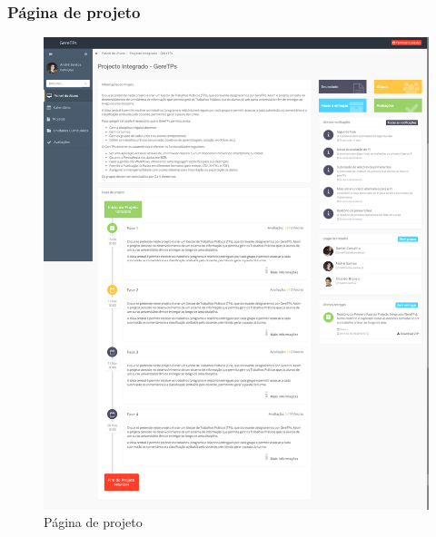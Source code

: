 \subsubsection{Página de projeto}

\begin{figure}[H]
  \centering
  \includegraphics[width=1\textwidth,center]{images/implementacao/alunos/project}
  \caption{Página de projeto}
  \label{fig:student_project}
\end{figure}
